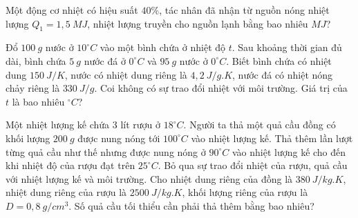 \begin{ex}%
	Một động cơ nhiệt có hiệu suất $40\%$, tác nhân đã nhận từ nguồn nóng nhiệt lượng $Q_1 = 1,5\ MJ$, nhiệt lượng truyền cho nguồn lạnh bằng bao nhiêu $MJ$?
\end{ex}

\begin{ex}%
	Đổ $100\ g$ nước ở $10^\circ C$ vào một bình chứa ở nhiệt độ $t$. Sau khoảng thời gian đủ dài, bình chứa $5\ g$ nước đá ở $0^\circ C$ và $95\ g$ nước ở $0^\circ C$. Biết bình chứa có nhiệt dung $150\ J/K$, nước có nhiệt dung riêng là $4,2\ J/g.K$, nước đá có nhiệt nóng chảy riêng là $330\ J/g$. Coi không có sự trao đổi nhiệt với môi trường. Giá trị của $t$ là bao nhiêu $^\circ C$?
\end{ex}

\begin{ex}%
	Một nhiệt lượng kế chứa $3$ lít rượu ở $18^\circ C$. Người ta thả một quả cầu đồng có khối lượng $200\ g$ được nung nóng tới $100^\circ C$ vào nhiệt lượng kế. Thả thêm lần lượt từng quả cầu như thế nhưng được nung nóng ở $90^\circ C$ vào nhiệt lượng kế cho đến khi nhiệt độ của rượu đạt trên $25^\circ C$. Bỏ qua sự trao đổi nhiệt của rượu, quả cầu với nhiệt lượng kế và môi trường. Cho nhiệt dung riêng của đồng là $380\ J/kg.K$, nhiệt dung riêng của rượu là $2500\ J/kg.K$, khối lượng riêng của rượu là $D=0,8\ g/cm^3$. Số quả cầu tối thiểu cần phải thả thêm bằng bao nhiêu?
\end{ex}

